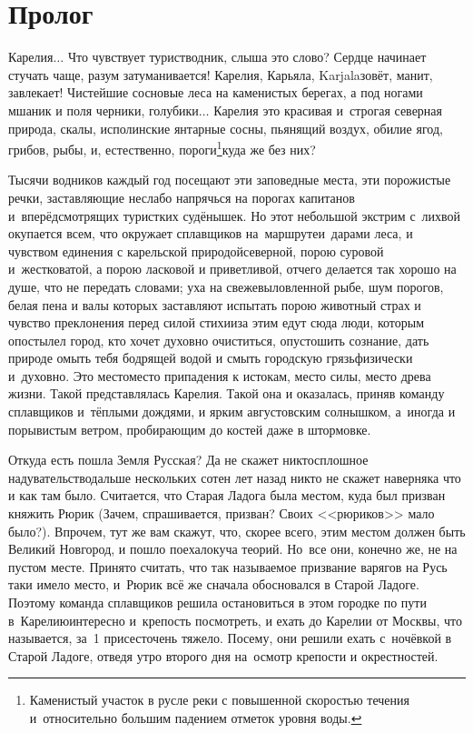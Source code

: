 {

{
\cleardoublepage
{}


\section*{Пролог}

\fancyhead[LE]{\fancyplain{}{}}
\fancyhead[RO]{\fancyplain{}{}}

Карелия$\ldots$ Что чувствует турист\sdash водник, слыша это слово? Сердце начинает стучать чаще, разум затуманивается! Карелия, Карьяла, Karjala\mdash зовёт, манит, завлекает! Чистейшие сосновые леса на каменистых берегах, а под ногами мшаник и поля черники, голубики$\ldots$ Карелия это красивая и~строгая северная природа, скалы, исполинские янтарные сосны, пьянящий воздух, обилие ягод, грибов, рыбы, и, естественно, пороги\footnote{Каменистый участок в русле реки с повышенной скоростью течения и~относительно большим падением отметок уровня воды.}\mdash куда же без них? 

Тысячи водников каждый год посещают эти заповедные места, эти порожистые речки, заставляющие неслабо напрячься на порогах капитанов и~вперёдсмотрящих туристких судёнышек. Но этот небольшой экстрим с~лихвой окупается всем, что окружает сплавщиков на~маршруте\mdash и~дарами леса, и чувством единения с карельской природой\mdash северной, порою суровой и~жестковатой, а порою ласковой и приветливой, отчего делается так хорошо на душе, что не передать словами; уха на свежевыловленной рыбе, шум порогов, белая пена и валы которых заставляют испытать порою животный страх и чувство преклонения перед силой стихии\mdash за этим едут сюда люди, которым опостылел город, кто хочет духовно очиститься, опустошить сознание, дать природе омыть тебя бодрящей водой и смыть городскую грязь\mdash физически и~духовно. Это место\mdash место припадения к истокам, место силы, место древа жизни. Такой представлялась Карелия. Такой она и оказалась, приняв команду сплавщиков и~тёплыми дождями, и ярким августовским солнышком, а~иногда и порывистым ветром, пробирающим до костей даже в штормовке.  

Откуда есть пошла Земля Русская? Да не скажет никто\mdash сплошное надувательство\mdash дальше нескольких сотен лет назад никто не скажет наверняка что и как там было. Считается, что Старая Ладога была местом, куда был призван княжить Рюрик (Зачем, спрашивается, призван? Своих <<рюриков>> мало было?). Впрочем, тут же вам скажут, что, скорее всего, этим местом должен быть Великий Новгород, и пошло поехало\mdash куча теорий. Но~все они, конечно же, не на пустом месте. Принято считать, что так называемое призвание варягов на Русь таки имело место, и~Рюрик всё же сначала обосновался в Старой Ладоге. Поэтому команда сплавщиков решила остановиться в этом городке по пути в~Карелию\mdash интересно и~крепость посмотреть, и ехать до Карелии от Москвы, что называется, за~1 присест\mdash очень тяжело. Посему, они решили ехать с~ночёвкой в Старой Ладоге, отведя утро второго дня на~осмотр крепости и окрестностей. 

}}
